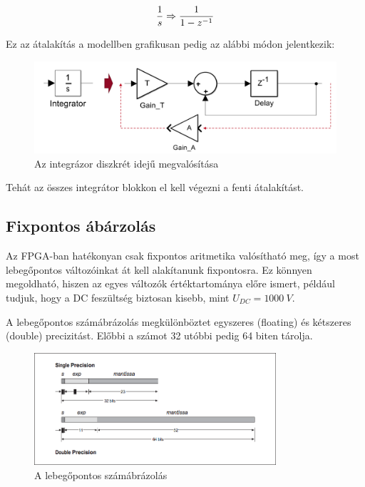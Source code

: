 \begin{equation}
\centering
\frac{1}{s} \Rightarrow \frac{1}{1-z^{-1}}
\end{equation}

Ez az átalakítás a modellben grafikusan pedig az alábbi módon jelentkezik:

\begin{figure}[h]
	\centering
	\includegraphics[width = \textwidth]{figures/integrator.png}
	\caption{Az integrázor diszkrét idejű megvalósítása} 
	\label{fig:integrator}
\end{figure}

Tehát az összes integrátor blokkon el kell végezni a fenti átalakítást.


\subsection{Fixpontos ábárzolás}

Az FPGA-ban hatékonyan csak fixpontos aritmetika valósítható meg, így a most lebegőpontos változóinkat át kell alakítanunk fixpontosra. Ez könnyen megoldható, hiszen az egyes változók értéktartománya előre ismert, például tudjuk, hogy a DC feszültség biztosan kisebb, mint $U_{DC}=1000\ V$.

A lebegőpontos számábrázolás megkülönböztet egyszeres (floating) és kétszeres (double) precizitást. Előbbi a számot 32 utóbbi pedig 64 biten tárolja.

\begin{figure}[H]
	\centering
	\includegraphics[width = 0.8\textwidth]{figures/floating.png}
	\caption{A lebegőpontos számábrázolás} 
	\label{fig:floating}
\end{figure}

